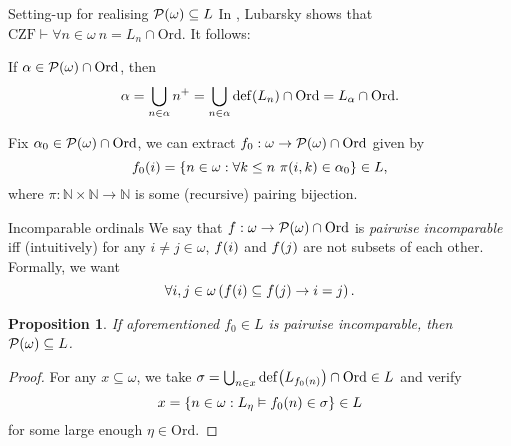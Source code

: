 \documentclass{beamer}
\newtheorem{proposition}{Proposition}
\theoremstyle{definition}
\newcommand{\CZF}{\mathrm{CZF}}
\newcommand{\Ord}{\mathrm{Ord}}
\begin{document}
\begin{frame}{Setting-up for realising $\mathcal{P}\mleft(\omega\mright) \subseteq L$}
  In \cite{lubarsky93-intuitionistic-l}, Lubarsky shows that $\CZF \vdash \forall n \in \omega \ n = L_n \cap \Ord$. It follows:

  \begin{lemma}
    If $\alpha \in \mathcal{P}\mleft(\omega\mright) \cap \Ord$, then
    \[\alpha = \bigcup_{n \in \alpha} n^+ = \bigcup_{n \in \alpha} \mathrm{def}\mleft(L_n\mright) \cap \Ord = L_\alpha \cap \Ord.\]
  \end{lemma}

  \pause

  Fix $\alpha_0 \in \mathcal{P}\mleft(\omega\mright) \cap \Ord$, we can extract $f_0 : \omega \rightarrow \mathcal{P}\mleft(\omega\mright) \cap \Ord$ given by
  \[f_0\mleft(i\mright) = \left\{n \in \omega : \forall k \leq n \ \pi\mleft(i, k\mright) \in \alpha_0\right\} \in L,\]
  where $\pi : \mathbb{N} \times \mathbb{N} \rightarrow \mathbb{N}$ is some (recursive) pairing bijection.
\end{frame}

\begin{frame}{Incomparable ordinals}
  We say that $f : \omega \rightarrow \mathcal{P}\mleft(\omega\mright) \cap \Ord$ is \emph{pairwise incomparable} iff (intuitively) for any $i \neq j \in \omega$, $f\mleft(i\mright)$ and $f\mleft(j\mright)$ are not subsets of each other. Formally, we want
  \[\forall i, j \in \omega \left(f\mleft(i\mright) \subseteq f\mleft(j\mright) \rightarrow i = j\right).\]

  \pause

  \begin{proposition}
    If aforementioned $f_0 \in L$ is pairwise incomparable, then $\mathcal{P}\mleft(\omega\mright) \subseteq L$.
  \end{proposition}

  \begin{proof}
    For any $x \subseteq \omega$, we take $\sigma = \bigcup_{n \in x} \mathrm{def}\mleft(L_{f_0\mleft(n\mright)}\mright) \cap \Ord \in L$ and verify
    \[x = \left\{n \in \omega : L_\eta \vDash f_0\mleft(n\mright) \in \sigma\right\} \in L\]
    for some large enough $\eta \in \Ord$.
  \end{proof}
\end{frame}
\end{document}
